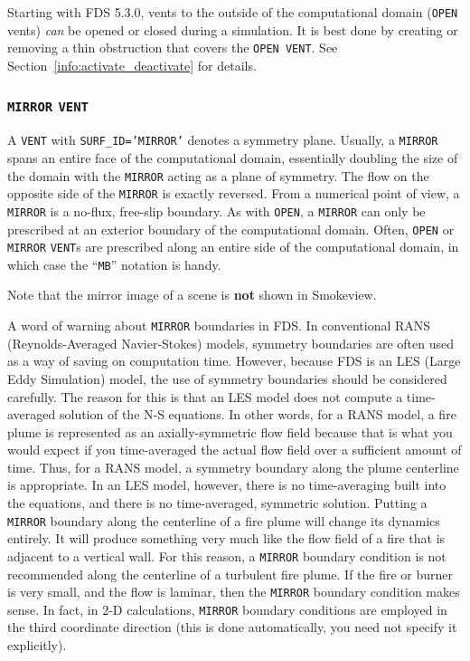 \documentclass[11pt]{book}
\newcommand{\ct}{\tt\small}
\begin{document}
\begin{warning}
Starting with FDS 5.3.0, vents to the outside of the computational domain ({\ct OPEN} vents)
{\em  can} be opened or closed during a simulation. It is best done by creating or removing a thin obstruction that covers the {\ct OPEN VENT}.
See Section~\ref{info:activate_deactivate} for details.
\end{warning}

\subsubsection{\texorpdfstring{{\tt MIRROR}}{MIRROR} \texorpdfstring{{\tt VENT}}{VENT}}

A {\ct VENT} with {\ct SURF\_ID='MIRROR'} denotes a symmetry plane. Usually, a {\ct MIRROR} spans an entire face of the computational
domain, essentially doubling the size of the domain with the {\ct MIRROR} acting as a plane of symmetry. The flow on the opposite side of the
{\ct MIRROR} is exactly reversed. From a numerical point of view, a {\ct MIRROR} is a no-flux, free-slip boundary. As with {\ct OPEN}, a {\ct MIRROR} can only be prescribed at an exterior boundary of the computational domain. Often, {\ct OPEN} or {\ct MIRROR} {\ct VENT}s are prescribed along an
entire side of the computational domain, in which case the ``{\ct MB}'' notation is handy.

\begin{warning}
\noindent
Note that the mirror image of a scene is {\bf not} shown in Smokeview.
\end{warning}

\noindent
A word of warning about {\ct MIRROR} boundaries in FDS. In conventional RANS (Reynolds-Averaged Navier-Stokes) models, symmetry boundaries are often used as a way of saving on computation time. However, because FDS is an LES (Large Eddy Simulation) model, the use of symmetry boundaries should be considered carefully. The reason for this is that an LES model does not compute a time-averaged solution of the N-S equations. In other words, for a RANS model, a fire plume is represented as an axially-symmetric flow field because that is what you would expect if you time-averaged the actual flow field over a sufficient amount of time. Thus, for a RANS model, a symmetry boundary along the plume centerline is appropriate. In an LES model, however, there is no time-averaging built into the equations, and there is no time-averaged, symmetric solution. Putting a {\ct MIRROR} boundary along the centerline of a fire plume will change its dynamics entirely. It will produce something very much like the flow field of a fire that is adjacent to a vertical wall. For this reason, a {\ct MIRROR} boundary condition is not recommended along the centerline of a turbulent fire plume. If the fire or burner is very small, and the flow is laminar, then the {\ct MIRROR} boundary condition makes sense. In fact, in 2-D calculations, {\ct MIRROR} boundary conditions are employed in the third coordinate direction (this is done automatically, you need not specify it explicitly).
\end{document}
